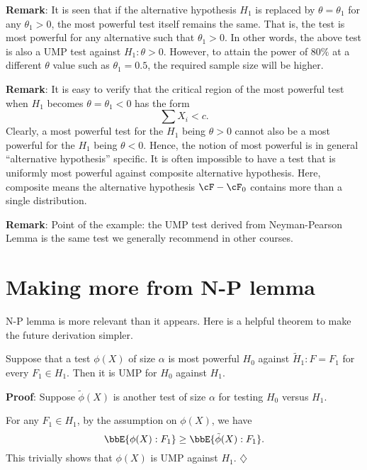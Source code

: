 \vs
\noindent
{\bf Remark}: It is seen that if the alternative hypothesis $H_1$
is replaced by $\theta = \theta_1$ for any $\theta_1 > 0$, the
most powerful test itself remains the same. That is, the test
is most powerful for any alternative such that $\theta_1 > 0$.
In other words, the above test is also a UMP test against
$H_1: \theta > 0$.
However, to attain the power of $80\%$ at a different $\theta$
value such as $\theta_1 = 0.5$,
the required sample size will be higher.

\vs
\noindent
{\bf Remark}: It is easy to verify that the critical region of the
most powerful test when $H_1$ becomes $\theta = \theta_1 < 0$
has the form
\[
\sum X_i < c.
\]
Clearly, a most powerful test for the $H_1$ being $\theta > 0$ cannot
also be a most powerful for the $H_1$ being $\theta < 0$.
Hence, the notion of most powerful is in general
``alternative hypothesis'' specific.
It is often impossible to have a test that is uniformly most
powerful against composite alternative hypothesis.
Here, composite means the alternative hypothesis
$\cF - \cF_0$ contains more than a single distribution.

\vs
\noindent
{\bf Remark}: 
Point of the example: the UMP test derived from Neyman-Pearson Lemma
is the same test we generally recommend in other courses.


\section{Making more from N-P lemma}

N-P lemma is more relevant than it appears. Here is a 
helpful theorem to make the future derivation simpler.

\begin{theorem}
Suppose that a test $\phi(X)$ of size $\alpha$ is most powerful
$H_0$ against $\tilde H_1: F = F_1$ for every $F_1 \in H_1$.
Then it is UMP for $H_0$ against $H_1$.
\end{theorem}

\vs\no
{\bf Proof}: Suppose $\tilde \phi(X)$ is another test of size $\alpha$
for testing $H_0$ versus $H_1$.

For any $F_1 \in H_1$, by the assumption on $\phi(X)$, we have
\[
\bbE \{ \phi(X): F_1\} \geq \bbE \{ \tilde \phi(X): F_1\}.
\]
This trivially shows that $\phi(X)$ is UMP against $H_1$.
\hfill{$\diamondsuit$}


